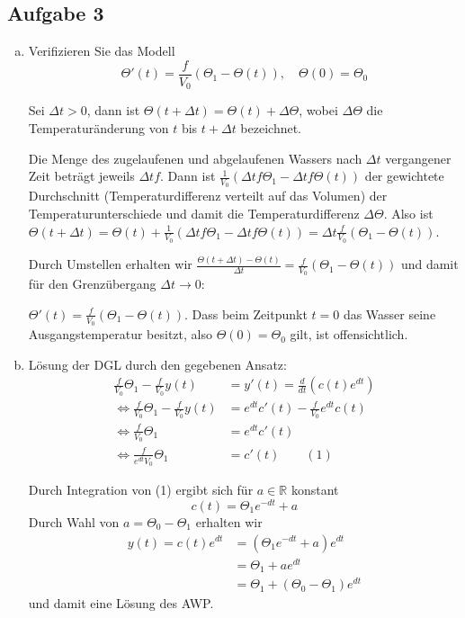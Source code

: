 \documentclass[11pt,a4paper,ngerman]{article}
\begin{document}
\subsection*{Aufgabe 3}
\begin{enumerate}[a)]
\item Verifizieren Sie das  Modell
$$ \Theta'(t) = \frac{f}{V_0}(\Theta_1 - \Theta(t)), \quad \Theta(0) = \Theta_0$$ 

Sei $\Delta t > 0$, dann ist $\Theta(t + \Delta t) = \Theta(t) + \Delta \Theta$, wobei $\Delta \Theta$ die Temperaturänderung von $t$ bis $t + \Delta t$ bezeichnet.

Die Menge des zugelaufenen und abgelaufenen Wassers nach $\Delta t$ vergangener Zeit beträgt jeweils $\Delta t f$. Dann ist $\frac{1}{V_0}(\Delta t f \Theta_1 - \Delta t f \Theta(t))$ der gewichtete Durchschnitt (Temperaturdifferenz verteilt auf das Volumen) der Temperaturunterschiede und damit die Temperaturdifferenz $\Delta \Theta$. Also ist $\Theta(t + \Delta t) = \Theta(t) + \frac{1}{V_0}(\Delta t f \Theta_1 - \Delta t f \Theta(t)) = \Delta t \frac{f}{V_0} (\Theta_1 - \Theta(t))$.

Durch Umstellen erhalten wir $\frac{\Theta(t + \Delta t) - \Theta(t)}{\Delta t} = \frac{f}{V_0} (\Theta_1 - \Theta(t))$ und damit für den Grenzübergang $\Delta t \to 0$:

$\Theta'(t) = \frac{f}{V_0} (\Theta_1 - \Theta(t))$. Dass beim Zeitpunkt $t= 0$ das Wasser seine Ausgangstemperatur besitzt, also $\Theta(0) = \Theta_0$ gilt, ist offensichtlich.

\item Lösung der  DGL durch den gegebenen Ansatz: 
\begin{equation*}\begin{split}
\frac{f}{V_0} \Theta_1 -\frac{f}{V_0} y(t) &= y' (t) = \frac{d}{dt} \left(c(t) e^{dt} \right) \\
\Leftrightarrow \frac{f}{V_0} \Theta_1 -\frac{f}{V_0} y(t) &= e^{dt} c'(t) - \frac{f}{V_0} e^{dt} c(t) \\
\Leftrightarrow \frac{f}{V_0} \Theta_1 &= e^{dt} c'(t) \\ 
\Leftrightarrow  \frac{f}{e^{dt} V_0} \Theta_1 &= c'(t) \qquad (1)
\end{split}\end{equation*}

Durch Integration von (1) ergibt sich für $a \in \mathbb{R}$ konstant
\begin{equation*}
c(t) = \Theta_1 e^{-dt} + a
\end{equation*}
Durch Wahl von $a = \Theta_0 - \Theta_1$ erhalten wir 
\begin{equation*}\begin{split}
y(t) = c(t) e^{dt} &= \left(\Theta_1 e^{-dt} + a\right) e^{dt} \\
&= \Theta_1 + a e^{dt} \\
&=  \Theta_1 + (\Theta_0 - \Theta_1) e^{dt}
\end{split}\end{equation*}
und damit eine Lösung des AWP.


\end{enumerate}
\end{document}
